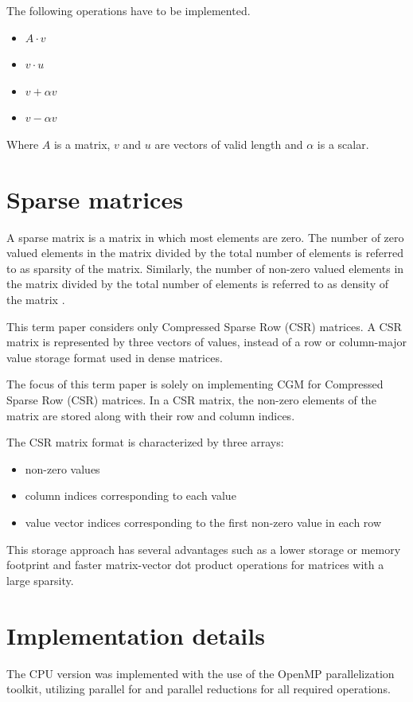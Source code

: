 \documentclass{article}
\begin{document}
The following operations have to be implemented.

\begin{itemize}
  \item $A \cdot v$
  \item $v \cdot u$
  \item $v + \alpha v$
  \item $v - \alpha v$
\end{itemize}

Where $A$ is a matrix, $v$ and $u$ are vectors of valid length and $\alpha$ is a scalar.

\section{Sparse matrices}
A sparse matrix is a matrix in which most elements are zero.
The number of zero valued elements in the matrix divided by the total number of elements
is referred to as sparsity of the matrix.
Similarly, the number of non-zero valued elements in the matrix divided by the total number
of elements is referred to as density of the matrix \cite{wiki_csr}.

This term paper considers only Compressed Sparse Row (CSR) matrices.
A CSR matrix is represented by three vectors of values, instead of
a row or column-major value storage format used in dense matrices.

The focus of this term paper is solely on implementing CGM for Compressed Sparse Row (CSR) matrices.
In a CSR matrix, the non-zero elements of the matrix are stored along with their row and column indices.

The CSR matrix format is characterized by three arrays:
\begin{itemize}
  \item non-zero values
  \item column indices corresponding to each value
  \item value vector indices corresponding to the first non-zero value in each row
\end{itemize}

This storage approach has several advantages such as a lower storage or memory footprint
and faster matrix-vector dot product operations for matrices with a large sparsity.

\section{Implementation details}
The CPU version was implemented with the use of the OpenMP parallelization toolkit,
utilizing parallel for and parallel reductions for all required operations.
\end{document}
